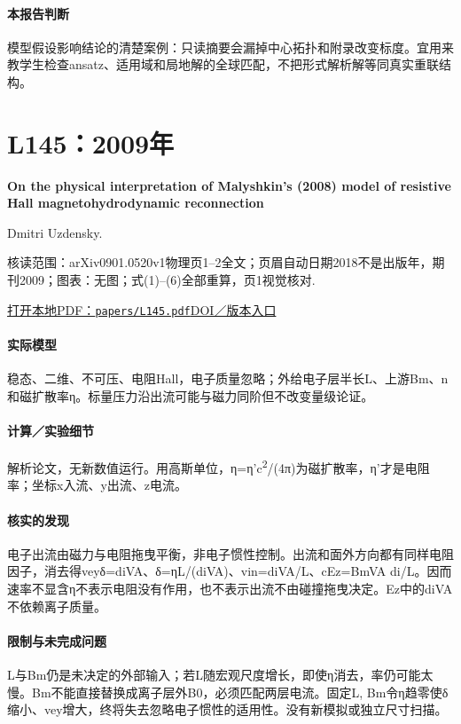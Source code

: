 \paragraph{本报告判断}模型假设影响结论的清楚案例：只读摘要会漏掉中心拓扑和附录改变标度。宜用来教学生检查ansatz、适用域和局地解的全球匹配，不把形式解析解等同真实重联结构。

\section{L145：2009年}\label{paper:L145}

\textbf{On the physical interpretation of Malyshkin’s (2008) model of resistive Hall magnetohydrodynamic reconnection}\citep{L145}\

Dmitri Uzdensky.

\textsf{核读范围：}arXiv0901.0520v1物理页1–2全文；页眉自动日期2018不是出版年，期刊2009；\textsf{图表：}无图；式(1)–(6)全部重算，页1视觉核对.

\href{run:papers/L145.pdf}{打开本地PDF：\texttt{papers/L145.pdf}}\quad\href{https://doi.org/10.1063/1.3125819}{DOI／版本入口}

\paragraph{实际模型}稳态、二维、不可压、电阻Hall，电子质量忽略；外给电子层半长L、上游Bm、n和磁扩散率η。标量压力沿出流可能与磁力同阶但不改变量级论证。

\paragraph{计算／实验细节}解析论文，无新数值运行。用高斯单位，η=η'c\textsuperscript{2}/(4π)为磁扩散率，η'才是电阻率；坐标x入流、y出流、z电流。

\paragraph{核实的发现}电子出流由磁力与电阻拖曳平衡，非电子惯性控制。出流和面外方向都有同样电阻因子，消去得veyδ=diVA、δ=ηL/(diVA)、vin=diVA/L、cEz=BmVA di/L。因而速率不显含η不表示电阻没有作用，也不表示出流不由碰撞拖曳决定。Ez中的diVA不依赖离子质量。

\paragraph{限制与未完成问题}L与Bm仍是未决定的外部输入；若L随宏观尺度增长，即使η消去，率仍可能太慢。Bm不能直接替换成离子层外B0，必须匹配两层电流。固定L, Bm令η趋零使δ缩小、vey增大，终将失去忽略电子惯性的适用性。没有新模拟或独立尺寸扫描。

